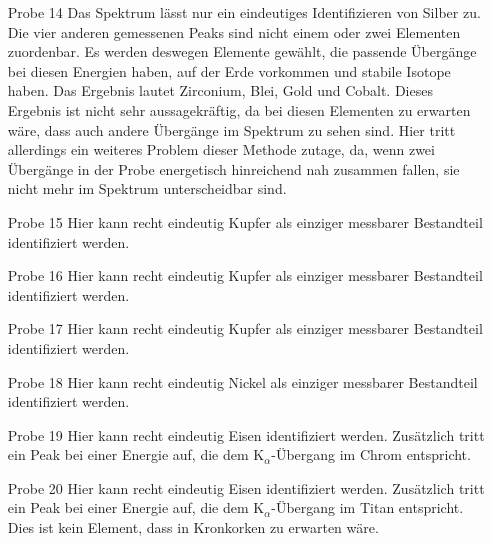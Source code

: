 \documentclass[
	a4paper,
	12pt,
	pagesize,
	ngerman
]{scrartcl}
\begin{document}
\begin{enumerate}
		\item[Probe 14] Das Spektrum lässt nur ein eindeutiges Identifizieren von Silber zu. Die vier anderen gemessenen Peaks sind nicht einem oder zwei Elementen zuordenbar. Es werden deswegen Elemente gewählt, die passende Übergänge bei diesen Energien haben, auf der Erde vorkommen und stabile Isotope haben. Das Ergebnis lautet Zirconium, Blei, Gold und Cobalt. Dieses Ergebnis ist nicht sehr aussagekräftig, da bei diesen Elementen zu erwarten wäre, dass auch andere Übergänge im Spektrum zu sehen sind. Hier tritt allerdings ein weiteres Problem dieser Methode zutage, da, wenn zwei Übergänge in der Probe energetisch hinreichend nah zusammen fallen, sie nicht mehr im Spektrum unterscheidbar sind.
		\item[Probe 15] Hier kann recht eindeutig Kupfer als einziger messbarer Bestandteil identifiziert werden.
		\item[Probe 16] Hier kann recht eindeutig Kupfer als einziger messbarer Bestandteil identifiziert werden.
		\item[Probe 17] Hier kann recht eindeutig Kupfer als einziger messbarer Bestandteil identifiziert werden.
		\item[Probe 18] Hier kann recht eindeutig Nickel als einziger messbarer Bestandteil identifiziert werden.
		\item[Probe 19] Hier kann recht eindeutig Eisen identifiziert werden. Zusätzlich tritt ein Peak bei einer Energie auf, die dem $\text{K}_\alpha$-Übergang im Chrom entspricht.
		\item[Probe 20] Hier kann recht eindeutig Eisen identifiziert werden. Zusätzlich tritt ein Peak bei einer Energie auf, die dem $\text{K}_\alpha$-Übergang im Titan entspricht. Dies ist kein Element, dass in Kronkorken zu erwarten wäre. %
	\end{enumerate}
	
\end{document}
